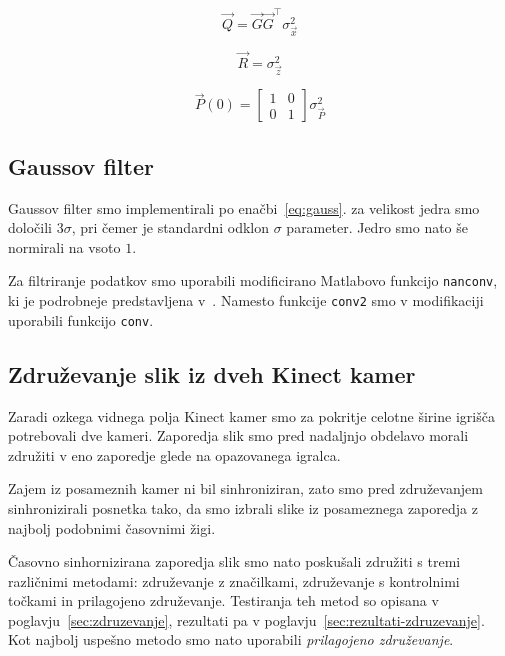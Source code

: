 \begin{equation}
\vec{Q} = \vec{G} \vec{G}^\top \sigma_\vec{x}^2
\label{eq:Q}
\end{equation}

\begin{equation}
\vec{R} = \sigma_\vec{z}^2
\label{eq:R}
\end{equation}

\begin{equation}
\vec{P}(0) = \begin{bmatrix}
1 & 0 \\
0 & 1
\end{bmatrix} \sigma_\vec{P}^2
\label{eq:P}
\end{equation}










\subsection{Gaussov filter}\label{sec:implementacija-gauss}

Gaussov filter smo implementirali po enačbi~\eqref{eq:gauss}. za velikost jedra smo določili $3\sigma$, pri čemer je standardni odklon $\sigma$ parameter. Jedro smo nato še normirali na vsoto $1$. 

Za filtriranje podatkov smo uporabili modificirano Matlabovo funkcijo \texttt{nanconv}, ki je podrobneje predstavljena v~\cite{kraus2017nanconv}. Namesto funkcije \texttt{conv2} smo v modifikaciji uporabili funkcijo \texttt{conv}.






\subsection{Združevanje slik iz dveh Kinect kamer}
Zaradi ozkega vidnega polja Kinect kamer smo za pokritje celotne širine igrišča potrebovali dve kameri. Zaporedja slik smo pred nadaljnjo obdelavo morali združiti v eno zaporedje glede na opazovanega igralca.

Zajem iz posameznih kamer ni bil sinhroniziran, zato smo pred združevanjem sinhronizirali posnetka tako, da smo izbrali slike iz posameznega zaporedja z najbolj podobnimi časovnimi žigi.

Časovno sinhornizirana zaporedja slik smo nato poskušali združiti s tremi različnimi metodami:  združevanje z značilkami, združevanje s kontrolnimi točkami in prilagojeno združevanje. Testiranja teh metod so opisana v poglavju~\ref{sec:zdruzevanje}, rezultati pa v poglavju~\ref{sec:rezultati-zdruzevanje}. Kot najbolj uspešno metodo smo nato uporabili \emph{prilagojeno združevanje}.

